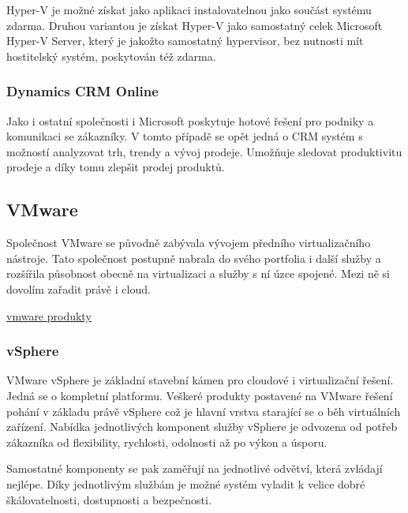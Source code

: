 Hyper-V je možné získat jako aplikaci instalovatelnou jako součást systému zdarma. Druhou variantou je získat Hyper-V jako samostatný celek Microsoft Hyper-V Server, který je jakožto samostatný hypervisor, bez nutnosti mít hostitelský systém, poskytován též zdarma.

\subsubsection{Dynamics CRM Online}
Jako i ostatní společnosti i Microsoft poskytuje hotové řešení pro podniky a komunikaci se zákazníky. V tomto případě se opět jedná o CRM systém s možností analyzovat trh, trendy a vývoj prodeje. Umožňuje sledovat produktivitu prodeje a díky tomu zlepšit prodej produktů.

\subsection{VMware}
Společnost VMware se původně zabývala vývojem předního virtualizačního nástroje. Tato společnost postupně nabrala do svého portfolia i další služby a rozšířila působnost obecně na virtualizaci a služby s ní úzce spojené. Mezi ně si dovolím zařadit právě i cloud.

\href{http://www.vmware.com/cz/products.html}{vmware produkty}

\subsubsection{vSphere}
\label{sec:vSphere}
\nocite{vmware:vSphere}
VMware vSphere je základní stavební kámen pro cloudové i virtualizační řešení. Jedná se o kompletní platformu. Veškeré produkty postavené na VMware řešení pohání v základu právě vSphere což je hlavní vrstva starající se o běh virtuálních zařízení. Nabídka jednotlivých komponent služby vSphere je odvozena od potřeb zákazníka od flexibility, rychlosti, odolnosti až po výkon a úsporu.

Samostatné komponenty se pak zaměřují na jednotlivé odvětví, která zvládají nejlépe. Díky jednotlivým službám je možné systém vyladit k velice dobré škálovatelnosti, dostupnosti a bezpečnosti.

